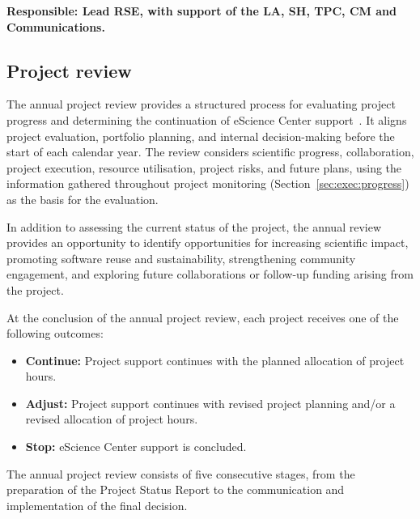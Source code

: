 \textbf{Responsible: Lead RSE, with support of the LA, SH, TPC, CM and Communications.} 

\subsection{Project review}
\label{sec:exec:review}
The annual project review provides a structured process for evaluating project progress and determining the
continuation of eScience Center support~\cite{nlesc-terms}. It aligns project evaluation, portfolio planning, and
internal decision-making before the start of each calendar year. The review considers scientific progress,
collaboration, project execution, resource utilisation, project risks, and future plans, using the information gathered
throughout project monitoring (Section~\ref{sec:exec:progress}) as the basis for the evaluation.

In addition to assessing the current status of the project, the annual review provides an opportunity to identify
opportunities for increasing scientific impact, promoting software reuse and sustainability, strengthening community
engagement, and exploring future collaborations or follow-up funding arising from the project.

At the conclusion of the annual project review, each project receives one of the following outcomes:
\vspace{-0.2cm}
\begin{itemize}[leftmargin=2em]
\item \textbf{Continue:} Project support continues with the planned allocation of project hours. 
\item \textbf{Adjust:} Project support continues with revised project planning and/or a revised allocation of project 
hours. 
\item \textbf{Stop:} eScience Center support is concluded.
\end{itemize}
\vspace{-0.2cm}

The annual project review consists of five consecutive stages, from the preparation of the Project Status Report to the 
communication and implementation of the final decision.

